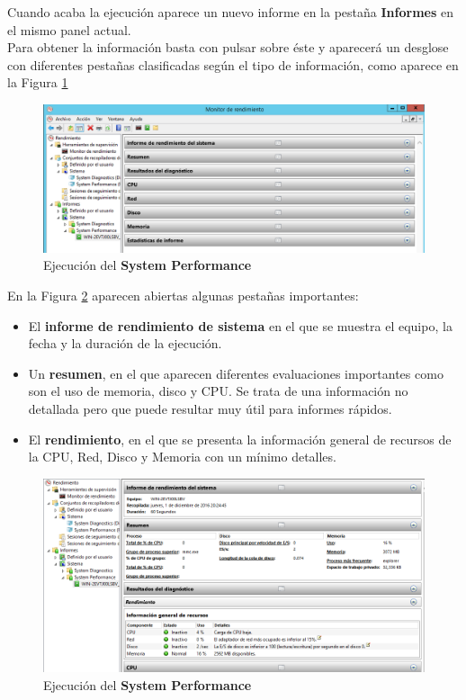 Cuando acaba la ejecución aparece un nuevo informe en la pestaña \textbf{Informes} en el mismo panel actual.
\\

Para obtener la información basta con pulsar sobre éste y aparecerá un desglose con diferentes pestañas clasificadas según el tipo de información, como aparece en la Figura \ref{fig:figura7-1}

\begin{figure}[H] %
	\centering
	\includegraphics[scale=0.6]{figuras/figura7-1.png} 
	\caption{Ejecución del \textbf{System Performance}} 
	\label{fig:figura7-1}
\end{figure}

En la Figura \ref{fig:figura7-2} aparecen abiertas algunas pestañas importantes: 

\begin{itemize}
	\item El \textbf{informe de rendimiento de sistema} en el que se muestra el equipo, la fecha y la duración de la ejecución.
	
	\item Un \textbf{resumen}, en el que aparecen diferentes evaluaciones importantes como son el uso de memoria, disco y CPU. Se trata de una información no detallada pero que puede resultar muy útil para informes rápidos.
	
	\item El \textbf{rendimiento}, en el que se presenta la información general de recursos de la CPU, Red, Disco y Memoria con un mínimo detalles.
\end{itemize}

\begin{figure}[H] %
	\centering
	\includegraphics[scale=0.5]{figuras/figura7-2.png} 
	\caption{Ejecución del \textbf{System Performance}} 
	\label{fig:figura7-2}
\end{figure}


